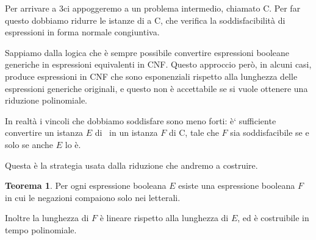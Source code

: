 \documentclass[12pt]{article}
\theoremstyle{definition}
\newtheorem*{mytheo}{Teorema}
\begin{document}
Per arrivare a 3\SAT ci appoggeremo a un problema intermedio, chiamato C\SAT. Per far questo dobbiamo
ridurre le istanze di \SAT a C\SAT, che verifica la soddisfacibilit\`a di espressioni in forma normale congiuntiva.

Sappiamo dalla logica che \`e sempre possibile convertire espressioni booleane generiche in espressioni
equivalenti in CNF. Questo approccio per\`o, in alcuni casi, produce espressioni in CNF che sono esponenziali
rispetto alla lunghezza delle espressioni generiche originali, e questo non \`e accettabile se si vuole
ottenere una riduzione polinomiale.

In realt\`a i vincoli che dobbiamo soddisfare sono meno forti: \`e` sufficiente convertire un istanza \(E\) di \SAT
\ in un istanza \(F\) di C\SAT, tale che \(F\) sia soddisfacibile se e solo se anche \(E\) lo \`e.

Questa \`e la strategia usata dalla riduzione che andremo a costruire.

\begin{mytheo}
  Per ogni espressione booleana \(E\) esiste una espressione booleana \(F\) in cui le
  negazioni compaiono solo nei letterali.

  Inoltre la lunghezza di \(F\) \`e lineare rispetto alla lunghezza di \(E\), ed \`e costruibile in
  tempo polinomiale.
\end{mytheo}
\end{document}
